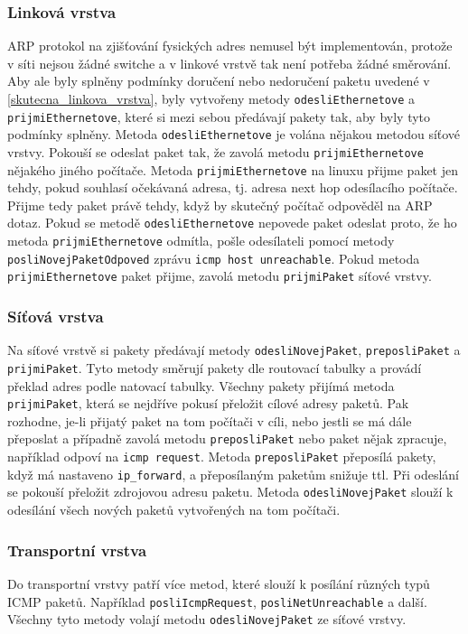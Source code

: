 \subsubsection{Linková vrstva}

ARP protokol na zjišťování fysických adres nemusel být implementován, protože v síti nejsou žádné switche a v linkové vrstvě tak není potřeba žádné směrování. Aby ale byly splněny podmínky doručení nebo nedoručení paketu uvedené v \ref{skutecna_linkova_vrstva}, byly vytvořeny metody \verb|odesliEthernetove| a \verb|prijmiEthernetove|, které si mezi sebou předávají pakety tak, aby byly tyto podmínky splněny. Metoda \verb|odesliEthernetove| je volána nějakou metodou síťové vrstvy. Pokouší se odeslat paket tak, že zavolá metodu \verb|prijmiEthernetove| nějakého jiného počítače. Metoda \verb|prijmiEthernetove| na linuxu přijme paket jen tehdy, pokud souhlasí očekávaná adresa, tj. adresa next hop odesílacího počítače. Přijme tedy paket právě tehdy, když by skutečný počítač odpověděl na ARP dotaz. Pokud se metodě \verb|odesliEthernetove| nepovede paket odeslat proto, že ho metoda \verb|prijmiEthernetove| odmítla, pošle odesílateli pomocí metody \verb|posliNovejPaketOdpoved| zprávu \verb|icmp host unreachable|. Pokud metoda \verb|prijmiEthernetove| paket přijme, zavolá metodu \verb|prijmiPaket| síťové vrstvy.

\subsubsection{Síťová vrstva}

Na síťové vrstvě si pakety předávají metody \verb|odesliNovejPaket|, \verb|preposliPaket| a \verb|prijmiPaket|. Tyto metody směrují pakety dle routovací tabulky a provádí překlad adres podle natovací tabulky. Všechny pakety přijímá metoda \verb|prijmiPaket|, která se nejdříve pokusí přeložit cílové adresy paketů. Pak rozhodne, je-li přijatý paket na tom počítači v cíli, nebo jestli se má dále přeposlat a případně zavolá metodu \verb|preposliPaket| nebo paket nějak zpracuje, například odpoví na \verb|icmp request|. Metoda \verb|preposliPaket| přeposílá pakety, když má nastaveno \verb|ip_forward|, a přeposílaným paketům snižuje ttl. Při odeslání se pokouší přeložit zdrojovou adresu paketu. Metoda \verb|odesliNovejPaket| slouží k odesílání všech nových paketů vytvořených na tom počítači.

\subsubsection{Transportní vrstva}

Do transportní vrstvy patří více metod, které slouží k posílání různých typů ICMP paketů. Například \verb|posliIcmpRequest|, \verb|posliNetUnreachable| a další. Všechny tyto metody volají metodu \verb|odesliNovejPaket| ze síťové vrstvy.
  
  

